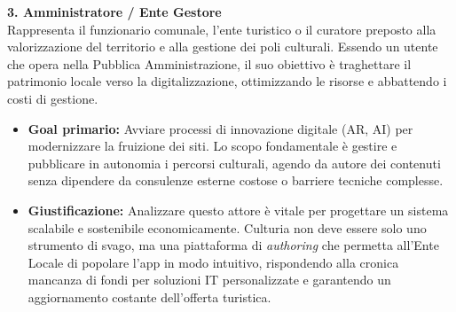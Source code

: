 \textcolor{culturiaRed}{\textbf{3. Amministratore / Ente Gestore}}\\
Rappresenta il funzionario comunale, l'ente turistico o il curatore preposto alla valorizzazione del territorio e alla gestione dei poli culturali. Essendo un utente che opera nella Pubblica Amministrazione, il suo obiettivo è traghettare il patrimonio locale verso la digitalizzazione, ottimizzando le risorse e abbattendo i costi di gestione.
\begin{itemize}
    \item \textbf{Goal primario:} Avviare processi di innovazione digitale (AR, AI) per modernizzare la fruizione dei siti. Lo scopo fondamentale è gestire e pubblicare in autonomia i percorsi culturali, agendo da autore dei contenuti senza dipendere da consulenze esterne costose o barriere tecniche complesse.
    \item \textbf{Giustificazione:} Analizzare questo attore è vitale per progettare un sistema scalabile e sostenibile economicamente. Culturia non deve essere solo uno strumento di svago, ma una piattaforma di \textit{authoring} che permetta all'Ente Locale di popolare l'app in modo intuitivo, rispondendo alla cronica mancanza di fondi per soluzioni IT personalizzate e garantendo un aggiornamento costante dell'offerta turistica.
\end{itemize}
